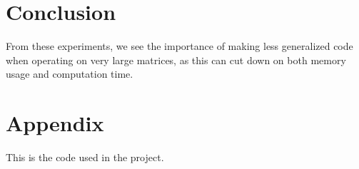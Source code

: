 \documentclass[a4paper,12pt,norsk]{article}
\begin{document}
\section{Conclusion}
	From these experiments, we see the importance of making less generalized code when operating on very large matrices, as this can cut down on both memory usage and computation time. 

\newpage
\section{Appendix}
	This is the code used in the project.

\end{document}
